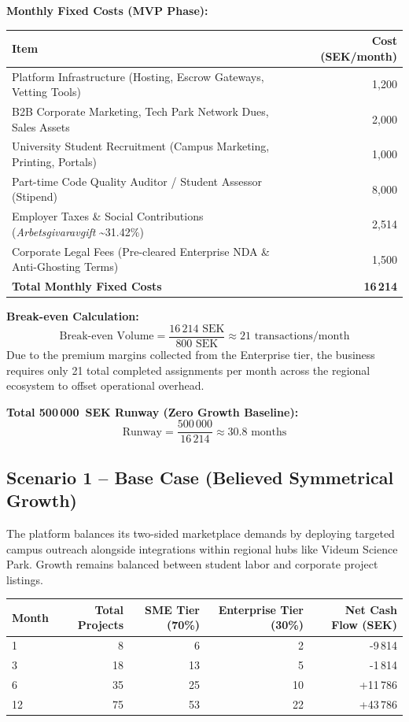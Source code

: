 \documentclass[12pt,a4paper]{article}
\begin{document}
\textbf{Monthly Fixed Costs (MVP Phase):}

\begin{tabularx}{\textwidth}{Xr}
\toprule
Item & Cost (SEK/month) \\
\midrule
Platform Infrastructure (Hosting, Escrow Gateways, Vetting Tools) & 1,200 \\
B2B Corporate Marketing, Tech Park Network Dues, Sales Assets & 2,000 \\
University Student Recruitment (Campus Marketing, Printing, Portals) & 1,000 \\
Part-time Code Quality Auditor / Student Assessor (Stipend) & 8,000 \\
Employer Taxes \& Social Contributions (\emph{Arbetsgivaravgift} \textasciitilde 31.42\%) & 2,514 \\
Corporate Legal Fees (Pre-cleared Enterprise NDA \& Anti-Ghosting Terms) & 1,500 \\
\midrule
\textbf{Total Monthly Fixed Costs} & \textbf{16\,214} \\
\bottomrule
\end{tabularx}

\textbf{Break-even Calculation:}
\[
  \text{Break-even Volume} = \frac{16\,214 \text{ SEK}}{800 \text{ SEK}} \approx 21 \text{ transactions/month}
\]
Due to the premium margins collected from the Enterprise tier, the business requires only 21 total completed assignments per month across the regional ecosystem to offset operational overhead.

\textbf{Total 500\,000~SEK Runway (Zero Growth Baseline):}
\[
  \text{Runway} = \frac{500\,000}{16\,214} \approx 30.8 \text{ months}
\]

\subsection{Scenario 1 -- Base Case (Believed Symmetrical Growth)}

The platform balances its two-sided marketplace demands by deploying targeted campus outreach alongside integrations within regional hubs like Videum Science Park. Growth remains balanced between student labor and corporate project listings.

\begin{tabularx}{\textwidth}{Xrrrr}
\toprule
Month & Total Projects & SME Tier (70\%) & Enterprise Tier (30\%) & Net Cash Flow (SEK) \\
\midrule
1  &   8 &   6 &   2 & -9\,814 \\
3  &  18 &  13 &   5 & -1\,814 \\
6  &  35 &  25 &  10 & +11\,786 \\
12 &  75 &  53 &  22 & +43\,786 \\
\bottomrule
\end{tabularx}
\end{document}
